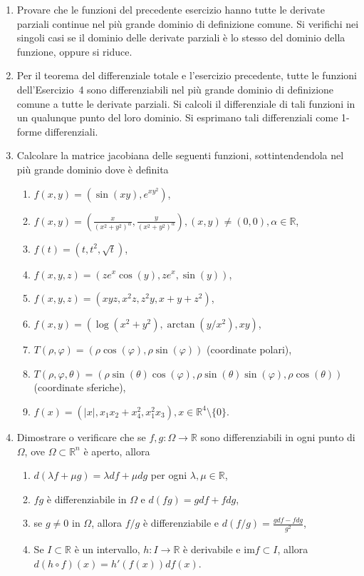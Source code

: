 \begin{enumerate}
	\item Provare che le funzioni del precedente esercizio hanno tutte le derivate parziali continue nel più grande dominio di definizione comune. Si verifichi nei singoli casi se il dominio delle derivate parziali è lo stesso del dominio della funzione, oppure si riduce.
	
	\item Per il teorema del differenziale totale e l'esercizio precedente, tutte le funzioni dell'Esercizio~4 sono differenziabili nel più grande dominio di definizione comune a tutte le derivate parziali. Si calcoli il differenziale di tali funzioni in un qualunque punto del loro dominio. Si esprimano tali differenziali come 1-forme differenziali.
	
	\item Calcolare la matrice jacobiana delle seguenti funzioni, sottintendendola nel più grande dominio dove è definita
	\begin{enumerate}
		\item $f(x,y) = \left(\sin(x y), e^{x y^2}\right)$,
		\item $f(x,y) = \left(\frac{x}{(x^2 + y^2)^\alpha}, \frac{y}{(x^2 + y^2)^\alpha}\right), (x,y) \neq (0,0), \alpha \in \mathbb{R}$,
		\item $f(t) = (t, t^2, \sqrt{t})$,
		\item $f(x,y,z) = \left(z e^x \cos(y), z e^x, \sin(y)\right)$,
		\item $f(x,y,z) = \left(x y z, x^2 z, z^2 y, x + y + z^2\right)$,
		\item $f(x,y) = \left(\log(x^2 + y^2), \arctan(y/x^2), x y\right)$,
		\item $T(\rho,\varphi) = (\rho \cos(\varphi), \rho \sin(\varphi))$ \quad (coordinate polari),
		\item $T(\rho,\varphi,\theta) = (\rho \sin(\theta) \cos(\varphi), \rho \sin(\theta) \sin(\varphi), \rho \cos(\theta))$ \quad (coordinate sferiche),
		\item $f(x) = \left(|x|, x_1 x_2 + x_4^2, x_1^2 x_3\right), x \in \mathbb{R}^4 \setminus \{0\}$.
	\end{enumerate}
	
	\item Dimostrare o verificare che se $f, g: \Omega \to \mathbb{R}$ sono differenziabili in ogni punto di $\Omega$, ove $\Omega \subset \mathbb{R}^n$ è aperto, allora
	\begin{enumerate}
		\item $d(\lambda f + \mu g) = \lambda d f + \mu d g$ per ogni $\lambda, \mu \in \mathbb{R}$,
		\item $f g$ è differenziabile in $\Omega$ e $d(f g) = g d f + f d g$,
		\item se $g \neq 0$ in $\Omega$, allora $f/g$ è differenziabile e $d(f/g) = \frac{g d f - f d g}{g^2}$,
		\item Se $I \subset \mathbb{R}$ è un intervallo, $h: I \to \mathbb{R}$ è derivabile e $\mathrm{im} f \subset I$, allora $d(h \circ f)(x) = h'(f(x)) d f(x)$.
	\end{enumerate}
	

\end{enumerate}
